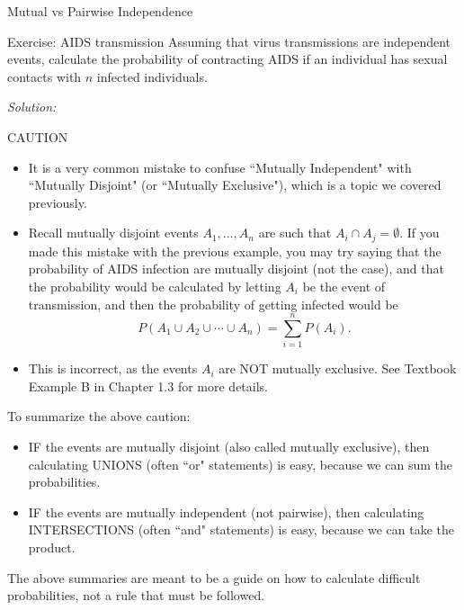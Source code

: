 \begin{frame}[allowframebreaks]{Mutual vs Pairwise Independence}
\begin{exampleblock}{Exercise: AIDS transmission}
    Assuming that virus transmissions are independent events, calculate the probability of contracting AIDS if an individual has sexual contacts with $n$ infected individuals.
  \end{exampleblock}

  \emph{Solution:}


  \framebreak

  \begin{block}{CAUTION}
    \begin{itemize}
      \item It is a very common mistake to confuse ``Mutually Independent" with ``Mutually Disjoint" (or ``Mutually Exclusive"), which is a topic we covered previously.

      \item Recall mutually disjoint events $A_1, \ldots, A_n$ are such that $A_i \cap A_j = \emptyset$. If you made this mistake with the previous example, you may try saying that the probability of AIDS infection are mutually disjoint (not the case), and that the probability would be calculated by letting $A_i$ be the event of transmission, and then the probability of getting infected would be
    $$
    P(A_1 \cup A_2 \cup \cdots \cup A_n) = \sum_{i = 1}^n P(A_i).
    $$
  \item This is incorrect, as the events $A_i$ are NOT mutually exclusive. See Textbook Example B in Chapter 1.3 for more details.
  \end{itemize}
  \end{block}

  To summarize the above caution:
  \begin{itemize}
    \item \alert{IF} the events are mutually disjoint (also called mutually exclusive), then calculating \alert{UNIONS} (often ``or" statements) is easy, because we can sum the probabilities.
    \item \alert{IF} the events are mutually independent (not pairwise), then calculating \alert{INTERSECTIONS} (often ``and" statements) is easy, because we can take the product.
  \end{itemize}

  The above summaries are meant to be a guide on how to calculate difficult probabilities, not a rule that must be followed.

\end{frame}

